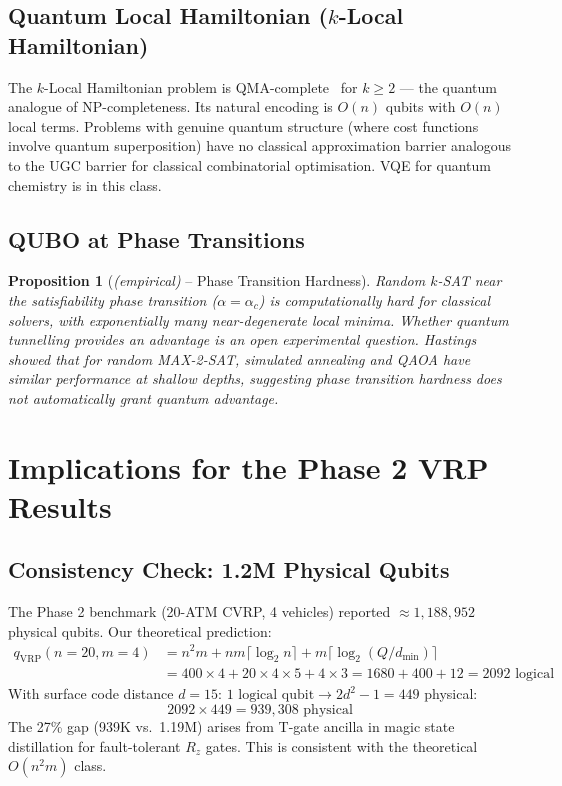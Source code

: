\documentclass[11pt]{article}
\newtheorem{proposition}[theorem]{Proposition}
\theoremstyle{remark}
\begin{document}
\subsection{Quantum Local Hamiltonian ($k$-Local Hamiltonian)}

The $k$-Local Hamiltonian problem is QMA-complete~\cite{kitaev2002} for
$k \geq 2$ --- the quantum analogue of NP-completeness. Its natural encoding
is $O(n)$ qubits with $O(n)$ local terms. Problems with genuine quantum
structure (where cost functions involve quantum superposition) have no
classical approximation barrier analogous to the UGC barrier for classical
combinatorial optimisation. VQE for quantum chemistry is in this class.

\subsection{QUBO at Phase Transitions}

\begin{proposition}[\emph{(empirical)} -- Phase Transition Hardness]
\label{prop:phase}
Random $k$-SAT near the satisfiability phase transition ($\alpha = \alpha_c$)
is computationally hard for classical solvers, with exponentially many
near-degenerate local minima. Whether quantum tunnelling provides an advantage
is an open experimental question. Hastings~\cite{hastings2021} showed that
for random MAX-2-SAT, simulated annealing and QAOA have similar performance
at shallow depths, suggesting phase transition hardness does not automatically
grant quantum advantage.
\end{proposition}

\section{Implications for the Phase 2 VRP Results}
\label{sec:vrp}

\subsection{Consistency Check: 1.2M Physical Qubits}

The Phase 2 benchmark (20-ATM CVRP, 4 vehicles) reported
$\approx 1{,}188{,}952$ physical qubits. Our theoretical prediction:
\begin{align}
  q_{\text{VRP}}(n=20, m=4)
    &= n^2 m + nm\lceil\log_2 n\rceil + m\lceil\log_2(Q/d_{\min})\rceil \\
    &= 400 \times 4 + 20 \times 4 \times 5 + 4 \times 3
     = 1680 + 400 + 12 = 2092\text{ logical}
\end{align}
With surface code distance $d=15$: $1\text{ logical qubit} \rightarrow 2d^2-1=449$
physical:
\begin{equation}
  2092 \times 449 = 939{,}308\text{ physical}
\end{equation}
The 27\% gap (939K vs.\ 1.19M) arises from T-gate ancilla in magic state
distillation for fault-tolerant $R_z$ gates. This is consistent with the
theoretical $O(n^2m)$ class.
\end{document}
